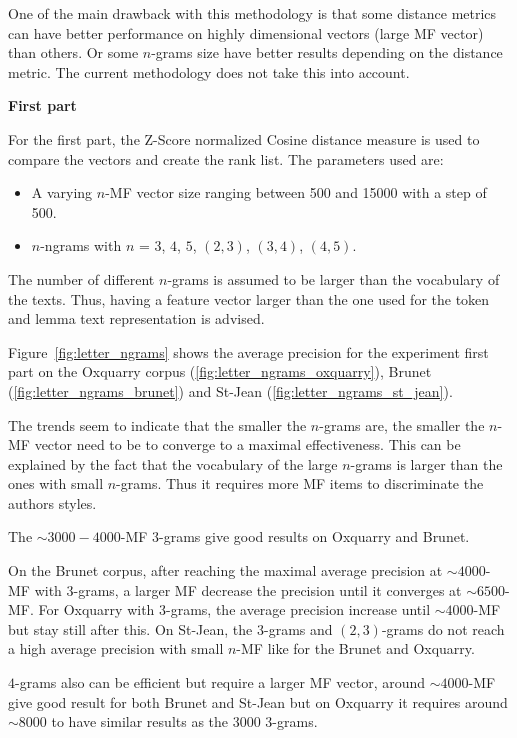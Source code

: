 One of the main drawback with this methodology is that some distance metrics can have better performance on highly dimensional vectors (large MF vector) than others.
Or some $n$-grams size have better results depending on the distance metric.
The current methodology does not take this into account.

\textbf{First part}

For the first part, the Z-Score normalized Cosine distance measure is used to compare the vectors and create the rank list.
The parameters used are:

\begin{itemize}
  \item
  A varying $n$-MF vector size ranging between 500 and 15000 with a step of 500.
  \item
  $n$-ngrams with $n$ = $3$, $4$, $5$, $(2, 3)$, $(3, 4)$, $(4, 5)$.
\end{itemize}

The number of different $n$-grams is assumed to be larger than the vocabulary of the texts.
Thus, having a feature vector larger than the one used for the token and lemma text representation is advised.

Figure~\ref{fig:letter_ngrams} shows the average precision for the experiment first part on the Oxquarry corpus (\ref{fig:letter_ngrams_oxquarry}), Brunet (\ref{fig:letter_ngrams_brunet}) and St-Jean (\ref{fig:letter_ngrams_st_jean}).

The trends seem to indicate that the smaller the $n$-grams are, the smaller the $n$-MF vector need to be to converge to a maximal effectiveness.
This can be explained by the fact that the vocabulary of the large $n$-grams is larger than the ones with small $n$-grams.
Thus it requires more MF items to discriminate the authors styles.

The $\sim 3000-4000$-MF $3$-grams give good results on Oxquarry and Brunet.

On the Brunet corpus, after reaching the maximal average precision at $\sim 4000$-MF with $3$-grams, a larger MF decrease the precision until it converges at $\sim 6500$-MF.
For Oxquarry with $3$-grams, the average precision increase until $\sim 4000$-MF but stay still after this.
On St-Jean, the $3$-grams and $(2,3)$-grams do not reach a high average precision with small $n$-MF like for the Brunet and Oxquarry.

$4$-grams also can be efficient but require a larger MF vector, around $\sim 4000$-MF give good result for both Brunet and St-Jean but on Oxquarry it requires around $\sim 8000$ to have similar results as the $3000$ $3$-grams.

